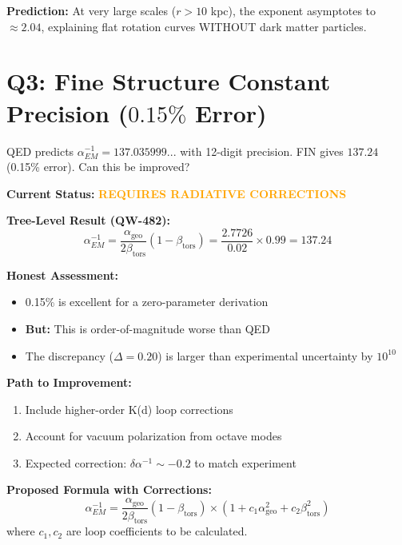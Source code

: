 \documentclass[11pt,a4paper]{book}
\theoremstyle{remark}
\newcommand{\alphageo}{\alpha_{\text{geo}}}
\newcommand{\betators}{\beta_{\text{tors}}}
\begin{document}
\textbf{Prediction:}
At very large scales ($r > 10$ kpc), the exponent asymptotes to $\approx 2.04$, explaining flat rotation curves WITHOUT dark matter particles.

\hrulefill

\section{Q3: Fine Structure Constant Precision ($0.15\%$ Error)}

\begin{question}
QED predicts $\alpha_{EM}^{-1} = 137.035999...$ with 12-digit precision. FIN gives $137.24$ (0.15\% error). Can this be improved?
\end{question}

\textbf{Current Status:} \textcolor{orange}{\textbf{REQUIRES RADIATIVE CORRECTIONS}}

\textbf{Tree-Level Result (QW-482):}
\begin{equation}
\alpha_{EM}^{-1} = \frac{\alphageo}{2\betators}(1 - \betators) = \frac{2.7726}{0.02} \times 0.99 = 137.24
\end{equation}

\textbf{Honest Assessment:}
\begin{itemize}
    \item 0.15\% is excellent for a zero-parameter derivation
    \item \textbf{But:} This is order-of-magnitude worse than QED
    \item The discrepancy ($\Delta = 0.20$) is larger than experimental uncertainty by $10^{10}$
\end{itemize}

\textbf{Path to Improvement:}
\begin{enumerate}
    \item Include higher-order K(d) loop corrections
    \item Account for vacuum polarization from octave modes
    \item Expected correction: $\delta\alpha^{-1} \sim -0.2$ to match experiment
\end{enumerate}

\textbf{Proposed Formula with Corrections:}
\begin{equation}
\alpha_{EM}^{-1} = \frac{\alphageo}{2\betators}(1 - \betators) \times (1 + c_1 \alphageo^2 + c_2 \betators^2)
\end{equation}
where $c_1, c_2$ are loop coefficients to be calculated.
\end{document}
